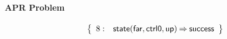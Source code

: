 \documentclass[a4paper]{article}
\newcommand{\symb}[1]{\mathsf{#1}}
\begin{document}
\paragraph{APR Problem}

\[
\left\{
\begin{array}{rr@{\>}c@{\>}ll}
\mathrm{8} : 
 & \symb{state}(\symb{far},\symb{ctrl0},\symb{up})
 & \Rightarrow 
 & \symb{success}\\

\end{array}
\right\}
\]
\end{document}
